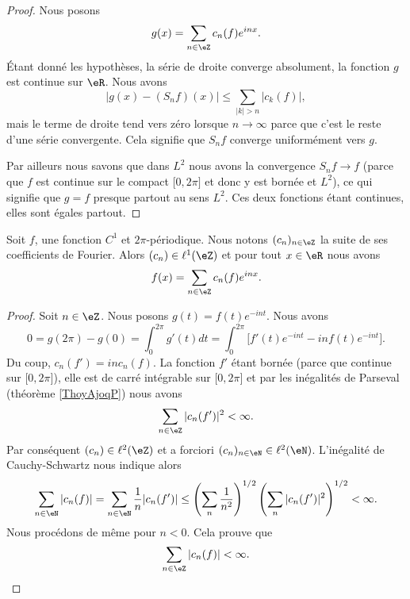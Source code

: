 \begin{proof}
    Nous posons 
    \begin{equation}
        g(x)=\sum_{n\in \eZ}c_n(f) e^{inx}.
    \end{equation}
    Étant donné les hypothèses, la série de droite converge absolument, la fonction \( g\) est continue sur \( \eR\). Nous avons
    \begin{equation}
        \big| g(x)-(S_nf)(x) \big|\leq \sum_{| k |> n}| c_k(f) |,
    \end{equation}
    mais le terme de droite tend vers zéro lorsque \( n\to \infty\) parce que c'est le reste d'une série convergente. Cela signifie que \( S_nf\) converge uniformément vers \( g\).

    Par ailleurs nous savons que dans \( L^2\) nous avons la convergence \( S_nf\to f\) (parce que \( f\) est continue sur le compact \( \mathopen[ 0 , 2\pi \mathclose]\) et donc y est bornée et \( L^2\)), ce qui signifie que \( g=f\) presque partout au sens \( L^2\). Ces deux fonctions étant continues, elles sont égales partout.
\end{proof}

\begin{theorem}     \label{ThozHXraQ}
    Soit \( f\), une fonction \( C^1\) et \( 2\pi\)-périodique. Nous notons \( (c_n)_{n\in \eZ}\) la suite de ses coefficients de Fourier. Alors \( (c_n)\in \ell^1(\eZ)\) et pour tout \( x\in \eR\) nous avons
    \begin{equation}
        f(x)=\sum_{n\in \eZ}c_n(f) e^{inx}.
    \end{equation}
\end{theorem}

\begin{proof}
    Soit \( n\in \eZ\). Nous posons \( g(t)=f(t) e^{-int}\). Nous avons
    \begin{equation}
        0=g(2\pi)-g(0)=\int_0^{2\pi}g'(t)dt=\int_0^{2\pi}\big[ f'(t) e^{-int}-inf(t) e^{-int} \big].
    \end{equation}
    Du coup, \( c_n(f')=inc_n(f)\). La fonction \( f'\) étant bornée (parce que continue sur \( \mathopen[ 0 , 2\pi \mathclose]\)), elle est de carré intégrable sur \( \mathopen[ 0 , 2\pi \mathclose]\) et par les inégalités de Parseval (théorème \ref{ThoyAjoqP}) nous avons
    \begin{equation}
        \sum_{n\in \eZ}| c_n(f') |^2<\infty.
    \end{equation}
    Par conséquent \( (c_n)\in \ell^2(\eZ)\) et a forciori \( (c_n)_{n\in \eN}\in \ell^2(\eN)\). L'inégalité de Cauchy-Schwartz nous indique alors
    \begin{equation}
        \sum_{n\in \eN}| c_n(f) |=\sum_{n\in \eN}\frac{1}{ n }| c_n(f') |\leq \left( \sum_n\frac{1}{ n^2 } \right)^{1/2}\left( \sum_{n}| c_n(f') |^2 \right)^{1/2}<\infty.
    \end{equation}
    Nous procédons de même pour \( n<0\). Cela prouve que 
    \begin{equation}
        \sum_{n\in \eZ}| c_n(f) |<\infty.
    \end{equation}
\end{proof}

